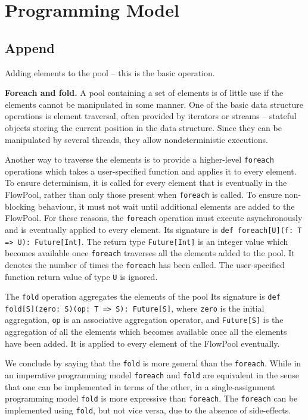 \documentclass[runningheads,a4paper]{llncs}
\begin{document}
\section{Programming Model}

\subsection{Append}
Adding elements to the pool -- this is the basic operation.

\textbf{Foreach and fold.}
A pool containing a set of elements is of little use if the elements
cannot be manipulated in some manner.
One of the basic data structure operations is element traversal,
often provided by iterators or streams -- stateful
objects storing the current position in the data structure.
Since they can be manipulated by several threads, they allow
nondeterministic executions.

Another way to traverse the elements is to provide a higher-level
\verb=foreach= operations which takes a user-specified function and
applies it to every element.
To ensure determinism, it is called for every element that is
eventually in the FlowPool, rather than only those present
when \verb=foreach= is called.
To ensure non-blocking behaviour, it must not wait until
additional elements are added to the FlowPool.
For these reasons, the \verb=foreach= operation must execute
asynchronously and is eventually applied to every element.
Its signature is \verb+def foreach[U](f: T => U): Future[Int]+.
The return type \verb=Future[Int]= is an integer value which becomes
available once \verb=foreach= traverses all the elements added to the
pool.
It denotes the number of times the \verb=foreach= has been called.
The user-specified function return value of type \verb=U= is ignored.

The \verb=fold= operation aggregates the elements of the pool
Its signature is \verb+def fold[S](zero: S)(op: T => S): Future[S]+,
where \verb=zero= is the initial aggregation, \verb=op= is an
associative aggregation operator, and \verb=Future[S]= is the aggregation
of all the elements which becomes available once all the elements have
been added.
It is applied to every element of the FlowPool
eventually.

We conclude by saying that the \verb=fold= is more general than the
\verb=foreach=.
While in an imperative programming model \verb=foreach= and \verb=fold= are
equivalent in the sense that one can be implemented in terms of the
other, in a single-assignment programming model \verb=fold= is more
expressive than \verb=foreach=.
The \verb=foreach= can be implemented using \verb=fold=, but not vice versa,
due to the absence of side-effects.
\end{document}
